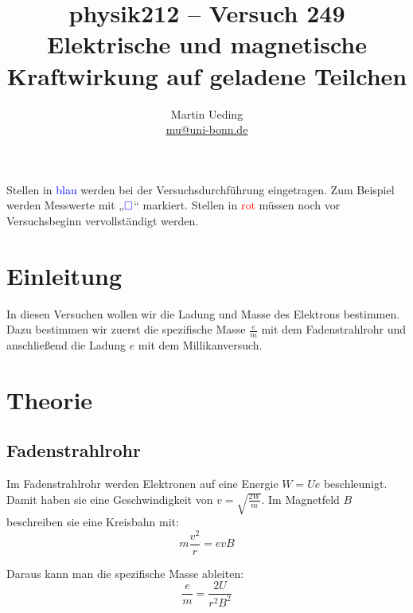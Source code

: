 \documentclass[11pt, ngerman]{article}
\title{physik212 -- Versuch 249 \\ Elektrische und magnetische Kraftwirkung auf geladene Teilchen}
\author{Martin Ueding \\ {\small \href{mailto:mu@uni-bonn.de}{mu@uni-bonn.de}}}
\newcommand{\messwert}{\textcolor{blue}{\square}}
\begin{document}
\maketitle

\tableofcontents

\vfill

\begin{small}
	Stellen in \textcolor{blue}{blau} werden bei der Versuchsdurchführung
	eingetragen. Zum Beispiel werden Messwerte mit „$\messwert$“ markiert.
	Stellen in \textcolor{red}{rot} müssen noch vor Versuchsbeginn
	vervollständigt werden.
\end{small}

\newpage


\section{Einleitung}

In diesen Versuchen wollen wir die Ladung und Masse des Elektrons bestimmen.
Dazu bestimmen wir zuerst die spezifische Masse $\frac em$ mit dem
Fadenstrahlrohr und anschließend die Ladung $e$ mit dem Millikanversuch.


\section{Theorie}

\subsection{Fadenstrahlrohr}

Im Fadenstrahlrohr werden Elektronen auf eine Energie $W = Ue$ beschleunigt.
Damit haben sie eine Geschwindigkeit von $v = \sqrt{\frac{2W}{m}}$. Im
Magnetfeld $B$ beschreiben sie eine Kreisbahn mit:
\[ m \frac{v^2}r = e v B \]

Daraus kann man die spezifische Masse ableiten:
\begin{equation}
	\label{eq:spezifische-Masse}
	\frac em = \frac{2U}{r^2 B^2}
\end{equation}
\end{document}
